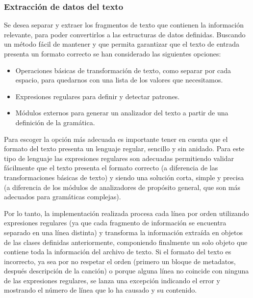 \subsubsection{Extracción de datos del texto}

Se desea separar y extraer los fragmentos de texto que contienen la información relevante, para poder convertirlos a las estructuras de datos definidas. Buscando un método fácil de mantener y que permita garantizar que el texto de entrada presenta un formato correcto se han considerado las siguientes opciones:

\begin{itemize}
	\item{Operaciones básicas de transformación de texto, como separar por cada espacio, para quedarnos con una lista de los valores que necesitamos.}
	\item{Expresiones regulares para definir y detectar patrones.}
	\item{Módulos externos para generar un analizador del texto a partir de una definición de la gramática.}
\end{itemize}


Para escoger la opción más adecuada es importante tener en cuenta que el formato del texto presenta un lenguaje regular, sencillo y sin anidado. Para este tipo de lenguaje las expresiones regulares son adecuadas permitiendo validar fácilmente que el texto presenta el formato correcto (a diferencia de las transformaciones básicas de texto) y siendo una solución corta, simple y precisa (a diferencia de los módulos de analizadores de propósito general, que son más adecuados para gramáticas complejas).

Por lo tanto, la implementación realizada procesa cada línea por orden utilizando expresiones regulares (ya que cada fragmento de información se encuentra separado en una línea distinta) y transforma la información extraída en objetos de las clases definidas anteriormente, componiendo finalmente un solo objeto que contiene toda la información del archivo de texto.  Si el formato del texto es incorrecto, ya sea por no respetar el orden (primero un bloque de metadatos, después descripción de la canción) o porque alguna línea no coincide con ninguna de las expresiones regulares, se lanza una excepción indicando el error y mostrando el número de línea que lo ha causado y su contenido.


